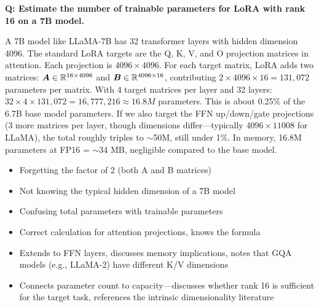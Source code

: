 \begin{interviewq}
\textbf{Q: Estimate the number of trainable parameters for LoRA with rank 16 on a 7B model.}

 \quad {} \quad \badgefreq{\freqhigh}

\stronganswer A 7B model like LLaMA-7B has 32 transformer layers with hidden dimension 4096. The standard LoRA targets are the Q, K, V, and O projection matrices in attention. Each projection is $4096 \times 4096$. For each target matrix, LoRA adds two matrices: $\bm{A} \in \mathbb{R}^{16 \times 4096}$ and $\bm{B} \in \mathbb{R}^{4096 \times 16}$, contributing $2 \times 4096 \times 16 = 131{,}072$ parameters per matrix. With 4 target matrices per layer and 32 layers: $32 \times 4 \times 131{,}072 = 16{,}777{,}216 \approx 16.8M$ parameters. This is about 0.25\% of the 6.7B base model parameters. If we also target the FFN up/down/gate projections (3 more matrices per layer, though dimensions differ---typically $4096 \times 11008$ for LLaMA), the total roughly triples to $\sim$50M, still under 1\%. In memory, 16.8M parameters at FP16 = $\sim$34 MB, negligible compared to the base model.

\redflags
\begin{itemize}
    \item Forgetting the factor of 2 (both A and B matrices)
    \item Not knowing the typical hidden dimension of a 7B model
    \item Confusing total parameters with trainable parameters
\end{itemize}


\goodgreat
\begin{itemize}
    \item {} Correct calculation for attention projections, knows the formula
    \item {} Extends to FFN layers, discusses memory implications, notes that GQA models (e.g., LLaMA-2) have different K/V dimensions
    \item {} Connects parameter count to capacity---discusses whether rank 16 is sufficient for the target task, references the intrinsic dimensionality literature
\end{itemize}

\end{interviewq}

